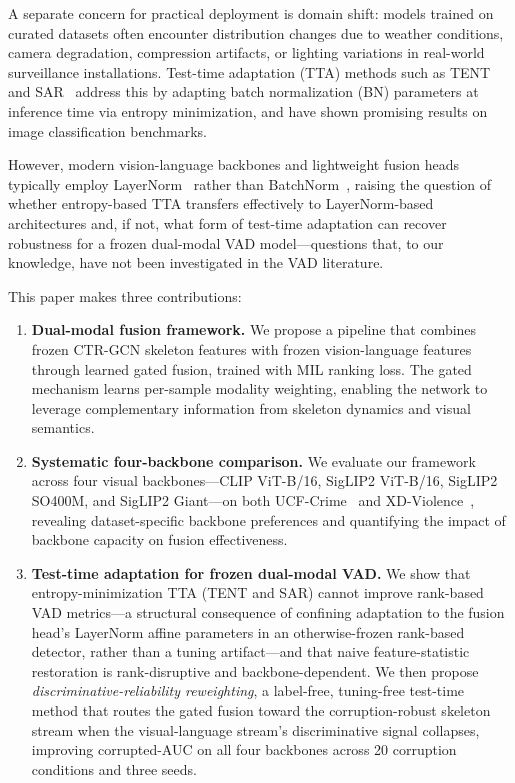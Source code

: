 \documentclass[sigconf]{acmart}
\begin{document}
A separate concern for practical deployment is domain shift: models trained on curated datasets often encounter distribution changes due to weather conditions, camera degradation, compression artifacts, or lighting variations in real-world surveillance installations. Test-time adaptation (TTA) methods such as TENT~\cite{wang2021tent} and SAR~\cite{niu2023sar} address this by adapting batch normalization (BN) parameters at inference time via entropy minimization, and have shown promising results on image classification benchmarks.

However, modern vision-language backbones and lightweight fusion heads typically employ LayerNorm~\cite{ba2016layernorm} rather than BatchNorm~\cite{ioffe2015batchnorm}, raising the question of whether entropy-based TTA transfers effectively to LayerNorm-based architectures and, if not, what form of test-time adaptation can recover robustness for a frozen dual-modal VAD model---questions that, to our knowledge, have not been investigated in the VAD literature.

This paper makes three contributions:

\begin{enumerate}
    \item \textbf{Dual-modal fusion framework.} We propose a pipeline that combines frozen CTR-GCN skeleton features with frozen vision-language features through learned gated fusion, trained with MIL ranking loss. The gated mechanism learns per-sample modality weighting, enabling the network to leverage complementary information from skeleton dynamics and visual semantics.

    \item \textbf{Systematic four-backbone comparison.} We evaluate our framework across four visual backbones---CLIP ViT-B/16, SigLIP2 ViT-B/16, SigLIP2 SO400M, and SigLIP2 Giant---on both UCF-Crime~\cite{sultani2018ucfcrime} and XD-Violence~\cite{wu2020xdviolence}, revealing dataset-specific backbone preferences and quantifying the impact of backbone capacity on fusion effectiveness.

    \item \textbf{Test-time adaptation for frozen dual-modal VAD.} We show that entropy-minimization TTA (TENT and SAR) cannot improve rank-based VAD metrics---a structural consequence of confining adaptation to the fusion head's LayerNorm affine parameters in an otherwise-frozen rank-based detector, rather than a tuning artifact---and that naive feature-statistic restoration is rank-disruptive and backbone-dependent. We then propose \emph{discriminative-reliability reweighting}, a label-free, tuning-free test-time method that routes the gated fusion toward the corruption-robust skeleton stream when the visual-language stream's discriminative signal collapses, improving corrupted-AUC on all four backbones across 20 corruption conditions and three seeds.
\end{enumerate}
\end{document}
